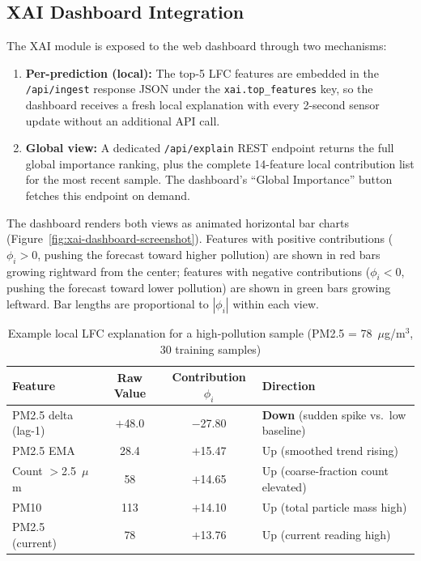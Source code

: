 \subsection{XAI Dashboard Integration}
\label{sec:meth-xai-dashboard}

The XAI module is exposed to the web dashboard through two mechanisms:

\begin{enumerate}
    \item \textbf{Per-prediction (local):} The top-5 LFC features are embedded in the \texttt{/api/ingest} response JSON under the \texttt{xai.top\_features} key, so the dashboard receives a fresh local explanation with every 2-second sensor update without an additional API call.
    \item \textbf{Global view:} A dedicated \texttt{/api/explain} REST endpoint returns the full global importance ranking, plus the complete 14-feature local contribution list for the most recent sample. The dashboard's ``Global Importance'' button fetches this endpoint on demand.
\end{enumerate}

The dashboard renders both views as animated horizontal bar charts (Figure~\ref{fig:xai-dashboard-screenshot}). Features with positive contributions ($\phi_i > 0$, pushing the forecast toward higher pollution) are shown in red bars growing rightward from the center; features with negative contributions ($\phi_i < 0$, pushing the forecast toward lower pollution) are shown in green bars growing leftward. Bar lengths are proportional to $|\phi_i|$ within each view.

\begin{table}[htbp]
\centering
\caption{Example local LFC explanation for a high-pollution sample (PM2.5 = 78~$\mu$g/m$^3$, 30 training samples)}
\label{tab:xai-example}
\small
\begin{tabular}{@{}lccl@{}}
\toprule
\textbf{Feature} & \textbf{Raw Value} & \textbf{Contribution $\phi_i$} & \textbf{Direction} \\
\midrule
PM2.5 delta (lag-1) & $+$48.0 & $-$27.80 & \textbf{Down} (sudden spike vs.\ low baseline) \\
PM2.5 EMA           & 28.4    & $+$15.47 & Up   (smoothed trend rising) \\
Count $>$2.5~$\mu$m & 58      & $+$14.65 & Up   (coarse-fraction count elevated) \\
PM10                & 113     & $+$14.10 & Up   (total particle mass high) \\
PM2.5 (current)     & 78      & $+$13.76 & Up   (current reading high) \\
\bottomrule
\end{tabular}
\end{table}


